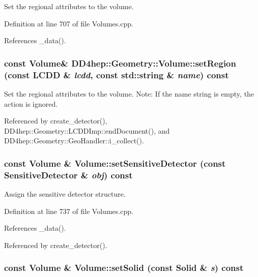 Set the regional attributes to the volume. 

Definition at line 707 of file Volumes.cpp.

References \_\-data().\hypertarget{class_d_d4hep_1_1_geometry_1_1_volume_a4070385330a1c5200adaaa13ef4e6547}{
\subsubsection[{setRegion}]{\setlength{\rightskip}{0pt plus 5cm}const {\bf Volume}\& DD4hep::Geometry::Volume::setRegion (const {\bf LCDD} \& {\em lcdd}, \/  const std::string \& {\em name}) const}}
\label{class_d_d4hep_1_1_geometry_1_1_volume_a4070385330a1c5200adaaa13ef4e6547}


Set the regional attributes to the volume. Note: If the name string is empty, the action is ignored. 

Referenced by create\_\-detector(), DD4hep::Geometry::LCDDImp::endDocument(), and DD4hep::Geometry::GeoHandler::i\_\-collect().\hypertarget{class_d_d4hep_1_1_geometry_1_1_volume_a0aab37c2e9c3d24ebbc6642f0951e217}{
\subsubsection[{setSensitiveDetector}]{\setlength{\rightskip}{0pt plus 5cm}const {\bf Volume} \& Volume::setSensitiveDetector (const {\bf SensitiveDetector} \& {\em obj}) const}}
\label{class_d_d4hep_1_1_geometry_1_1_volume_a0aab37c2e9c3d24ebbc6642f0951e217}


Assign the sensitive detector structure. 

Definition at line 737 of file Volumes.cpp.

References \_\-data().

Referenced by create\_\-detector().\hypertarget{class_d_d4hep_1_1_geometry_1_1_volume_ab620d3dc2b453442d9b806e338b661f7}{
\subsubsection[{setSolid}]{\setlength{\rightskip}{0pt plus 5cm}const {\bf Volume} \& Volume::setSolid (const {\bf Solid} \& {\em s}) const}}
\label{class_d_d4hep_1_1_geometry_1_1_volume_ab620d3dc2b453442d9b806e338b661f7}


